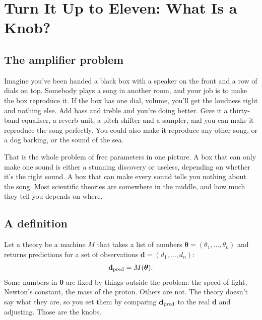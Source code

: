 \chapter{Turn It Up to Eleven: What Is a Knob?}




\section{The amplifier problem}

Imagine you've been handed a black box with a speaker on the front and a row of dials on top. Somebody plays a song in another room, and your job is to make the box reproduce it. If the box has one dial, volume, you'll get the loudness right and nothing else. Add bass and treble and you're doing better. Give it a thirty-band equaliser, a reverb unit, a pitch shifter and a sampler, and you can make it reproduce the song perfectly. You could also make it reproduce any other song, or a dog barking, or the sound of the sea.

That is the whole problem of free parameters in one picture. A box that can only make one sound is either a stunning discovery or useless, depending on whether it's the right sound. A box that can make every sound tells you nothing about the song. Most scientific theories are somewhere in the middle, and how much they tell you depends on where.



\section{A definition}

Let a theory be a machine $M$ that takes a list of numbers $\boldsymbol\theta=(\theta_1,\dots,\theta_k)$ and returns predictions for a set of observations $\mathbf{d}=(d_1,\dots,d_n)$:
\begin{equation}
\mathbf{d}_{\rm pred}=M(\boldsymbol\theta).
\end{equation}
Some numbers in $\boldsymbol\theta$ are fixed by things outside the problem: the speed of light, Newton's constant, the mass of the proton. Others are not. The theory doesn't say what they are, so you set them by comparing $\mathbf{d}_{\rm pred}$ to the real $\mathbf{d}$ and adjusting. Those are the knobs.

